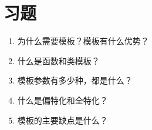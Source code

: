 \section{习题}
\begin{enumerate}
  \item 为什么需要模板？模板有什么优势？
  \item 什么是函数和类模板？
  \item 模板参数有多少种，都是什么？
  \item 什么是偏特化和全特化？
  \item 模板的主要缺点是什么？
\end{enumerate}